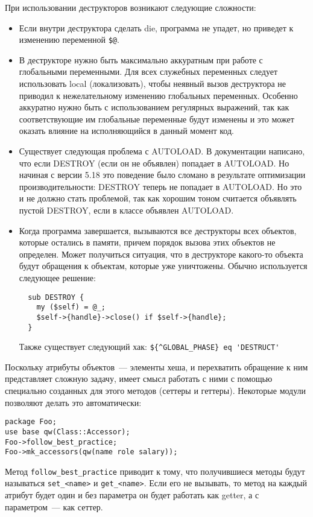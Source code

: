 При использовании деструкторов возникают следующие сложности:
\begin{itemize}
  \item Если внутри деструктора сделать die, программа не упадет, но приведет к изменению переменной \verb|$@|.

  \item В деструкторе нужно быть максимально аккуратным при работе с глобальными переменными. Для всех служебных переменных следует использовать local (локализовать), чтобы неявный вызов деструктора не приводил к нежелательному изменению глобальных переменных. Особенно аккуратно нужно быть с использованием регулярных выражений, так как соответствующие им глобальные переменные будут изменены и это может оказать влияние на исполняющийся в данный момент код.

  \item Существует следующая проблема с AUTOLOAD. В документации написано, что если DESTROY (если он не объявлен) попадает в AUTOLOAD. Но начиная с версии 5.18 это поведение было сломано в результате оптимизации производительности: DESTROY теперь не попадает в AUTOLOAD. Но это и не должно стать проблемой, так как хорошим тоном считается объявлять пустой DESTROY, если в классе объявлен AUTOLOAD.

  \item Когда программа завершается, вызываются все деструкторы всех объектов, которые остались в памяти, причем порядок вызова этих объектов не определен. Может получиться ситуация, что в деструкторе какого-то объекта будут обращения к объектам, которые уже уничтожены. Обычно используется следующее решение:
\begin{verbatim}
  sub DESTROY {
    my ($self) = @_;
    $self->{handle}->close() if $self->{handle};
  }
\end{verbatim}
  Также существует следующий хак: \verb|${^GLOBAL_PHASE} eq 'DESTRUCT'|
\end{itemize}

Поскольку атрибуты объектов~--- элементы хеша, и перехватить обращение к ним представляет сложную задачу, имеет смысл работать с ними с помощью специально созданных для этого методов (сеттеры и геттеры). Некоторые модули позволяют делать это автоматически:
\begin{verbatim}
package Foo;
use base qw(Class::Accessor);
Foo->follow_best_practice;
Foo->mk_accessors(qw(name role salary));
\end{verbatim}
Метод \verb|follow_best_practice| приводит к тому, что получившиеся методы будут называться \verb|set_<name>| и \verb|get_<name>|. Если его не вызывать, то метод на каждый атрибут будет один и без параметра он будет работать как getter, а с параметром~--- как сеттер.

